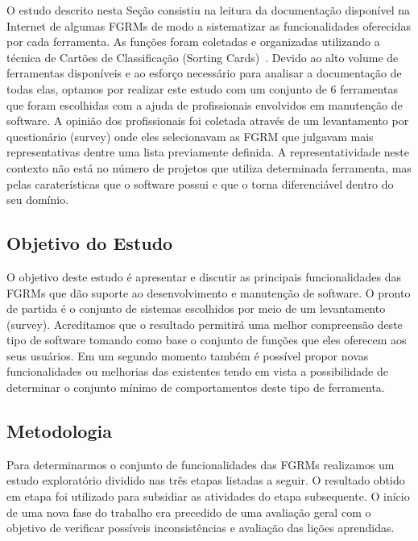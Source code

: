 O estudo descrito nesta Seção consistiu na leitura da documentação disponível na
Internet de algumas FGRMs de modo a sistematizar as funcionalidades
o\-fe\-re\-ci\-das por cada ferramenta. As funções foram coletadas e organizadas
utilizando a técnica de Cartões de Classificação (Sorting Cards)~\cite{5070993,
    rugg2005sorting}. Devido ao alto volume de ferramentas disponíveis e ao
esforço necessário para analisar a documentação de todas elas, optamos por
realizar este estudo com um conjunto de 6 ferramentas que foram escolhidas com a
ajuda de profissionais envolvidos em manutenção de software. A opinião dos
profissionais foi coletada através de um levantamento por questionário (survey)
onde eles selecionavam as FGRM que julgavam mais representativas dentre uma
lista previamente definida. A representatividade neste contexto não está no
número de projetos que utiliza determinada ferramenta, mas pelas caraterísticas
que o software possui e que o torna diferenciável dentro do seu domínio.

\subsection{Objetivo do Estudo}
\label{subsec:caracterizacao_objetivo_do_capitulo}

O objetivo deste estudo é apresentar e discutir as principais funcionalidades
das FGRMs que dão suporte ao desenvolvimento e manutenção de software. O pronto
de partida é o conjunto de sistemas escolhidos por meio de um levantamento
(survey). Acreditamos que o resultado permitirá uma melhor compreensão deste
tipo de software tomando como base o conjunto de funções que eles oferecem aos
seus usuários. Em um segundo momento também é possível propor novas
funcionalidades ou melhorias das existentes tendo em vista a possibilidade de
determinar o conjunto mínimo de comportamentos deste tipo de ferramenta.

\subsection{Metodologia}
\label{subsec:metodologia}

Para determinarmos o conjunto de funcionalidades das FGRMs realizamos um estudo
exploratório dividido nas três etapas listadas a seguir. O resultado obtido em
etapa foi utilizado para subsidiar as atividades do etapa subsequente. O início
de uma nova fase do trabalho era precedido de uma avaliação geral com o objetivo
de verificar possíveis inconsistências e avaliação das lições aprendidas.

